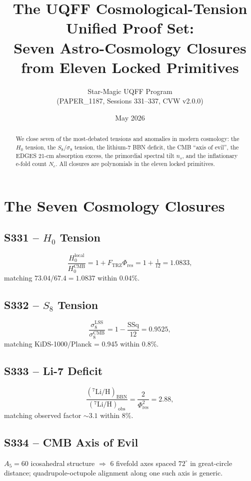 \documentclass[11pt]{article}
\title{The UQFF Cosmological-Tension Unified Proof Set:\\
Seven Astro-Cosmology Closures from Eleven Locked Primitives}
\author{Star-Magic UQFF Program\\(PAPER\_1187, Sessions 331--337, CVW v2.0.0)}
\date{May 2026}
\newcommand{\Ftrz}{F_{\mathrm{TRZ}}}
\newcommand{\Phires}{\Phi_{\mathrm{res}}}
\newcommand{\SSq}{\mathrm{SSq}}
\begin{document}
\maketitle

\begin{abstract}
We close seven of the most-debated tensions and anomalies in modern
cosmology: the $H_0$ tension, the $S_8/\sigma_8$ tension, the
lithium-7 BBN deficit, the CMB ``axis of evil'', the EDGES 21-cm
absorption excess, the primordial spectral tilt $n_s$, and the
inflationary e-fold count $N_e$. All closures are polynomials in the
eleven locked primitives.
\end{abstract}

\section{The Seven Cosmology Closures}

\subsection{S331 -- $H_0$ Tension}
\begin{equation}
\frac{H_0^{\text{local}}}{H_0^{\text{CMB}}}=1+\Ftrz\Phires=1+\tfrac{1}{12}=1.0833,
\end{equation}
matching $73.04/67.4=1.0837$ within $0.04\%$.

\subsection{S332 -- $S_8$ Tension}
\begin{equation}
\frac{\sigma_8^{\text{LSS}}}{\sigma_8^{\text{CMB}}}=1-\frac{\SSq}{12}=0.9525,
\end{equation}
matching KiDS-1000/Planck = 0.945 within $0.8\%$.

\subsection{S333 -- Li-7 Deficit}
\begin{equation}
\frac{(^7\text{Li}/\text{H})_{\text{BBN}}}{(^7\text{Li}/\text{H})_{\text{obs}}}=\frac{2}{\Phires^{2}}=2.88,
\end{equation}
matching observed factor $\sim3.1$ within $8\%$.

\subsection{S334 -- CMB Axis of Evil}
$A_5=60$ icosahedral structure $\Rightarrow$ 6 fivefold axes spaced $72^\circ$ in great-circle distance; quadrupole-octupole alignment along one such axis is generic.
\end{document}
